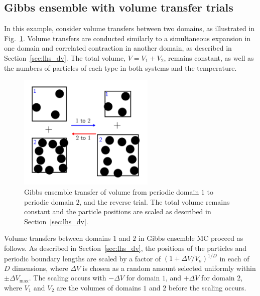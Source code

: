 \documentclass[
  9pt,
  bestpractices,
]{livecoms}
\begin{document}
\begin{figure}

\end{figure}

\subsection{\label{sec:lhs_gibbs_volume}Gibbs ensemble with volume transfer trials}

In this example, consider volume transfers between two domains, as illustrated in Fig.~\ref{fig:gibbs_volume}.
Volume transfers are conducted similarly to a simultaneous expansion in one domain and correlated contraction in another domain, as described in Section~\ref{sec:lhs_dv}.
The total volume, $V=V_1+V_2$, remains constant, as well as the numbers of particles of each type in both systems and the temperature.

\begin{figure}
\includegraphics[width=6.5cm]{../figures/gibbs_volume.png}
\caption{
Gibbs ensemble transfer of volume from periodic domain $1$ to periodic domain $2$, and the reverse trial.
The total volume remains constant and the particle positions are scaled as described in Section~\ref{sec:lhs_dv}.
}
\label{fig:gibbs_volume}
\end{figure}

Volume transfers between domains $1$ and $2$ in Gibbs ensemble MC proceed as follows.
As described in Section~\ref{sec:lhs_dv}, the positions of the particles and periodic boundary lengths are scaled by a factor of $(1+\Delta V/V_o)^{1/D}$ in each of $D$ dimensions, where $\Delta V$ is chosen as a random amount selected uniformly within $\pm\Delta V_{\mathrm{max}}$.
The scaling occurs with $-\Delta V$ for domain $1$, and $+\Delta V$ for domain 2, where $V_1$ and $V_2$ are the volumes of domains $1$ and $2$ before the scaling occurs.
\end{document}

